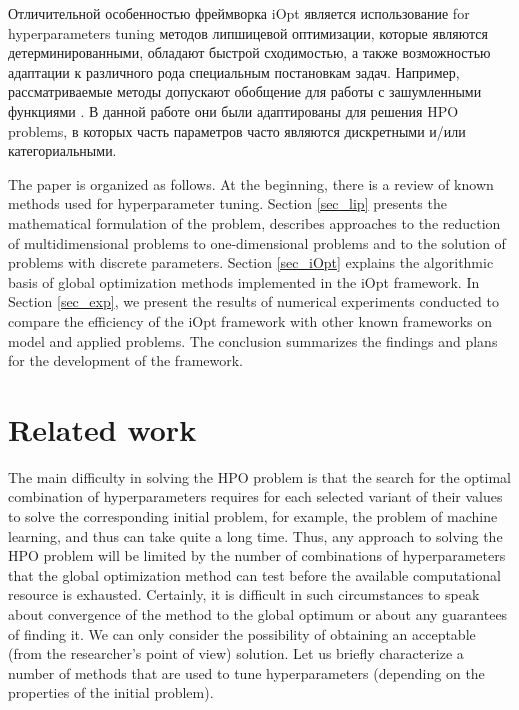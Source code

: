 \documentclass[preprint,12pt]{elsarticle}
\begin{document}
\textcolor[rgb]{1,0,0}{Отличительной особенностью фреймворка iOpt является использование for hyperparameters tuning методов липшицевой оптимизации, которые являются детерминированными, обладают быстрой сходимостью, а также возможностью адаптации к различного рода специальным постановкам задач.
Например, рассматриваемые методы допускают обобщение для работы с зашумленными функциями \cite{Sergeyev2020}. В данной работе они были адаптированы для решения HPO problems, в которых часть параметров часто являются дискретными и/или категориальными.}


The paper is organized as follows. At the beginning, there is a review of known methods used for hyperparameter tuning. Section \ref{sec_lip} presents the mathematical formulation of the problem, describes approaches to the reduction of multidimensional problems to one-dimensional problems and to the solution of problems with discrete parameters. Section \ref{sec_iOpt} explains the algorithmic basis of global optimization methods implemented in the iOpt framework. In Section \ref{sec_exp}, we present the results of numerical experiments conducted to compare the efficiency of the iOpt framework with other known frameworks on model and applied problems. The conclusion summarizes the findings and plans   for the development of the framework.


\section{Related work}
\label{sec_rel}

The main difficulty in solving the HPO problem is that the search for the optimal combination of hyperparameters requires for each selected variant of their values to solve the corresponding initial problem, for example, the problem of machine learning, and thus can take quite a long time. Thus, any approach to solving the HPO problem will be limited by the number of combinations of hyperparameters that the global optimization method can test before the available computational resource is exhausted.  Certainly, it is difficult in such circumstances to speak about convergence of the method to the global optimum or about any guarantees of finding it. We can only consider the possibility of obtaining an acceptable (from the researcher's point of view) solution. Let us briefly characterize a number of methods that are used to tune hyperparameters (depending on the properties of the initial problem). 
\end{document}
